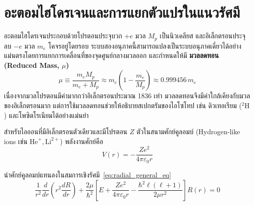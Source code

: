 \section{อะตอมไฮโดรเจนและการแยกตัวแปรในแนวรัศมี}

อะตอมไฮโดรเจนประกอบด้วยโปรตอนประจุบวก $+e$ มวล $M_p$ เป็นนิวเคลียส และอิเล็กตรอนประจุลบ $-e$ มวล $m_e$ โคจรอยู่โดยรอบ ระบบสองอนุภาคนี้สามารถแปลงเป็นระบบอนุภาคเดี่ยวได้อย่างแม่นตรงโดยการแยกการเคลื่อนที่ของจุดศูนย์กลางมวลออก และกำหนดให้มี \textbf{มวลลดทอน (Reduced Mass, $\mu$)}
\begin{equation}
\mu \equiv \frac{m_e M_p}{m_e + M_p} \approx m_e \left( 1 - \frac{m_e}{M_p} \right) \approx 0.999456 \, m_e
\label{eq:reduced_mass}
\end{equation}
เนื่องจากมวลโปรตอนมีค่ามากกว่าอิเล็กตรอนประมาณ 1836 เท่า มวลลดทอนจึงมีค่าใกล้เคียงกับมวลของอิเล็กตรอนมาก แต่การใช้มวลลดทอนช่วยให้อธิบายสเปกตรัมของไอโซโทป เช่น ดิวเทอเรียม ($^2\text{H}$) และโพซิตโรเนียมได้อย่างแม่นยำ

สำหรับไอออนที่มีอิเล็กตรอนตัวเดียวและมีโปรตอน $Z$ ตัวในสนามศักย์คูลอมบ์ (Hydrogen-like ions เช่น $\text{He}^+, \text{Li}^{2+}$) พลังงานศักย์คือ
\begin{equation}
V(r) = -\frac{Z e^2}{4\pi\varepsilon_0 r}
\label{eq:coulomb_potential_z}
\end{equation}

นำศักย์คูลอมบ์แทนลงในสมการเชิงรัศมี~\eqref{eq:radial_general_eq}
\begin{equation}
\frac{1}{r^2}\frac{d}{dr}\left( r^2 \frac{dR}{dr} \right) + \frac{2\mu}{\hbar^2}\left[ E + \frac{Ze^2}{4\pi\varepsilon_0 r} - \frac{\hbar^2 \ell(\ell + 1)}{2\mu r^2} \right] R(r) = 0
\label{eq:radial_differential_full}
\end{equation}

